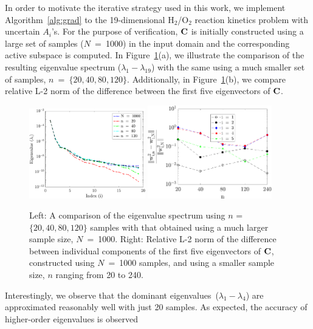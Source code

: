 In order to motivate the iterative strategy used in this work, we implement Algorithm~\ref{alg:grad} to the
19-dimensional H$_2$/O$_2$ reaction kinetics problem with uncertain $A_i$'s. For the purpose of
verification, $\mathbf{{C}}$ is initially constructed using a large set of samples ($N$~=~1000) in the input
domain and the corresponding active subspace is computed. In Figure~\ref{fig:eig_comp}(a), we illustrate
the comparison of the resulting eigenvalue spectrum ($\lambda_1 - \lambda_{19}$) with the same using a much 
smaller set of samples, $n$~=~$\{20,40,80,120\}$. Additionally, in Figure~\ref{fig:eig_comp}(b), we compare
relative L-2 norm of the difference between the first five eigenvectors of $\mathbf{{C}}$.
%
\begin{figure}[htbp]
 \begin{center}
  \includegraphics[width=0.45\textwidth]{./Figures/eig_comp}
   \includegraphics[width=0.48\textwidth]{./Figures/err_eigv_1_5}
\caption{Left: A comparison of the eigenvalue spectrum using $n$ = $\{20,40,80,120\}$ samples with that
obtained using a much larger sample size, $N$~=~1000. Right: Relative L-2 norm of the difference between
individual components of the first five eigenvectors of $\mathbf{{C}}$, constructed using $N$~=~1000 samples,
and using a smaller sample size, $n$ ranging from 20 to 240.} 
\label{fig:eig_comp}
\end{center}
\end{figure}
%
Interestingly, we observe that the dominant eigenvalues~($\lambda_1 - \lambda_4$) are approximated 
reasonably well with just 20 samples. As expected, the accuracy of higher-order eigenvalues is observed

